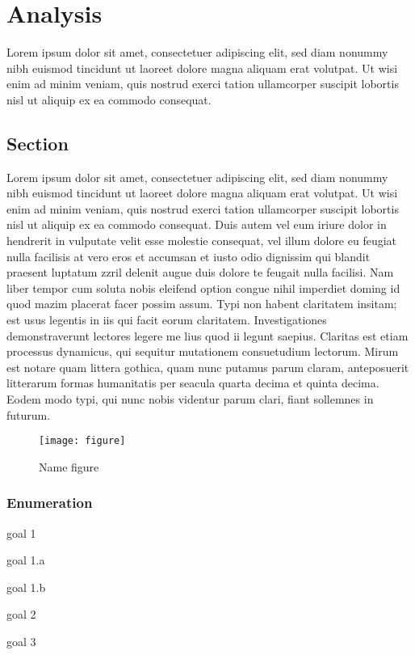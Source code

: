 \newpage
\chapter{Analysis}
\label{ch:Analysis}
Lorem ipsum dolor sit amet, consectetuer adipiscing elit, sed diam nonummy nibh euismod tincidunt ut laoreet dolore magna aliquam erat volutpat. Ut wisi enim ad minim veniam, quis nostrud exerci tation ullamcorper suscipit lobortis nisl ut aliquip ex ea commodo consequat. 

\section{Section}
\label{sec:Section}
Lorem ipsum dolor sit amet, consectetuer adipiscing elit, sed diam nonummy nibh euismod tincidunt ut laoreet dolore magna aliquam erat volutpat. Ut wisi enim ad minim veniam, quis nostrud exerci tation ullamcorper suscipit lobortis nisl ut aliquip ex ea commodo consequat. Duis autem vel eum iriure dolor in hendrerit in vulputate velit esse molestie consequat, vel illum dolore eu feugiat nulla facilisis at vero eros et accumsan et iusto odio dignissim qui blandit praesent luptatum zzril delenit augue duis dolore te feugait nulla facilisi. Nam liber tempor cum soluta nobis eleifend option congue nihil imperdiet doming id quod mazim placerat facer possim assum. Typi non habent claritatem insitam; est usus legentis in iis qui facit eorum claritatem. Investigationes demonstraverunt lectores legere me lius quod ii legunt saepius. Claritas est etiam processus dynamicus, qui sequitur mutationem consuetudium lectorum. Mirum est notare quam littera gothica, quam nunc putamus parum claram, anteposuerit litterarum formas humanitatis per seacula quarta decima et quinta decima. Eodem modo typi, qui nunc nobis videntur parum clari, fiant sollemnes in futurum.
\begin{figure}[H]
\begin{center}\texttt{[image: figure]}\end{center}
\caption[Name figure]{Name figure}\label{fig:figure}
\end{figure}

\subsection{Enumeration}
\begin{my_enumerate}
	\item {goal 1}
	\begin{my_enumerate}
		\item {goal 1.a}
		\item {goal 1.b}
	\end{my_enumerate}
	\item {goal 2}
	\item {goal 3}
\end{my_enumerate}
